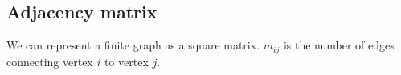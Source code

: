 
\subsection{Adjacency matrix}

We can represent a finite graph as a square matrix. \(m_{ij}\) is the number of edges connecting vertex \(i\) to vertex \(j\).

